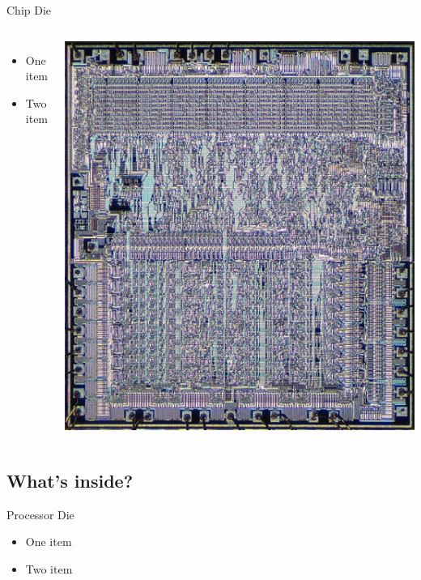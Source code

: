 \documentclass{beamer}
\begin{document}
\begin{frame}{Chip Die}
  \begin{columns}
    \begin{itemize}
    \item
      One item
    \item
      Two item
    \end{itemize}

    \includegraphics[scale=0.25]{../assets/MOS_6502_die.eps}
    
  \end{columns}
\end{frame}


\subsection[Internals]{What's inside?}

\begin{frame}{Processor Die}
  \begin{itemize}
  \item
    One item
  \item
    Two item
  \end{itemize}
\end{frame}
\end{document}
